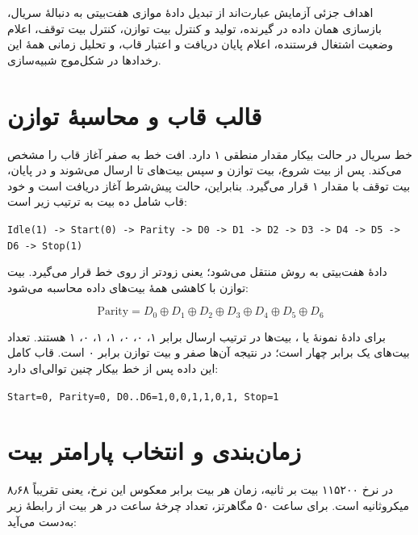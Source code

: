 اهداف جزئی آزمایش عبارت‌اند از تبدیل دادهٔ موازی هفت‌بیتی به دنبالهٔ سریال، بازسازی همان
داده در گیرنده، تولید و کنترل بیت توازن، کنترل بیت توقف، اعلام وضعیت اشتغال فرستنده، اعلام
پایان دریافت و اعتبار قاب، و تحلیل زمانی همهٔ این رخدادها در شکل‌موج شبیه‌سازی.


\section{قالب قاب و محاسبهٔ توازن}

خط سریال در حالت بیکار مقدار منطقی ۱ دارد. افت خط به صفر آغاز قاب را مشخص می‌کند. پس از
بیت شروع، بیت توازن و سپس بیت‌های  تا  ارسال می‌شوند و در پایان، بیت توقف
با مقدار ۱ قرار می‌گیرد. بنابراین، حالت  پیش‌شرط آغاز دریافت است و خود قاب شامل
ده بیت به ترتیب زیر است:

\begin{latin}
\begin{center}
\texttt{Idle(1) -> Start(0) -> Parity -> D0 -> D1 -> D2 -> D3 -> D4 -> D5 -> D6 -> Stop(1)}
\end{center}
\end{latin}

دادهٔ هفت‌بیتی به روش  منتقل می‌شود؛ یعنی  زودتر از
 روی خط قرار می‌گیرد. بیت توازن با  کاهشی همهٔ بیت‌های داده محاسبه
می‌شود:

\begin{equation}
\mathrm{Parity}=D_0 \oplus D_1 \oplus D_2 \oplus D_3 \oplus D_4 \oplus D_5 \oplus D_6
\end{equation}

برای دادهٔ نمونهٔ  یا ، بیت‌ها در ترتیب ارسال برابر ۱، ۰، ۰،
۱، ۱، ۰، ۱ هستند. تعداد بیت‌های یک برابر چهار است؛ در نتیجه  آن‌ها صفر و بیت
توازن برابر ۰ است. قاب کامل این داده پس از خط بیکار چنین توالی‌ای دارد:

\begin{latin}
\begin{center}
\texttt{Start=0, Parity=0, D0..D6=1,0,0,1,1,0,1, Stop=1}
\end{center}
\end{latin}


\section{زمان‌بندی و انتخاب پارامتر بیت}

در نرخ ۱۱۵۲۰۰ بیت بر ثانیه، زمان هر بیت برابر معکوس این نرخ، یعنی تقریباً ۸٫۶۸
میکروثانیه است. برای ساعت ۵۰ مگاهرتز، تعداد چرخهٔ ساعت در هر بیت از رابطهٔ زیر به‌دست
می‌آید:

